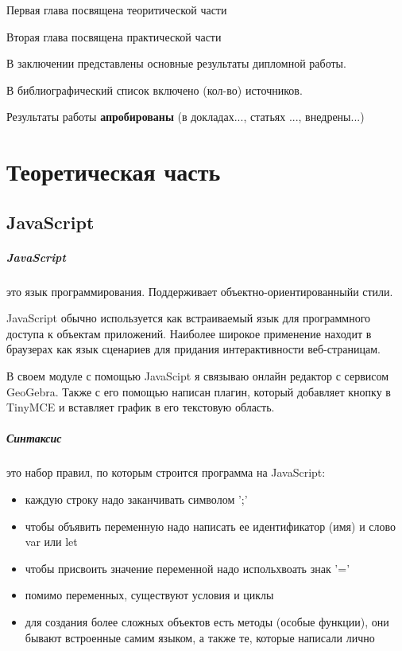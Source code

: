 \documentclass[14pt,Diplom]{diplomwork}
\begin{document}
Первая глава посвящена теоритической части

Вторая глава посвящена практической части


В заключении представлены основные результаты дипломной работы.

В библиографический список включено (кол-во) источников.


Результаты работы \textbf{апробированы} (в докладах..., статьях ..., внедрены...)


\chapter{Теоретическая часть}

\section{JavaScript}

\paragraph{JavaScript}

это язык программирования. Поддерживает объектно-ориентированныйи стили.

JavaScript обычно используется как встраиваемый язык для программного доступа к объектам приложений. Наиболее широкое применение находит в браузерах как язык сценариев для придания интерактивности веб-страницам.

В своем модуле с помощью JavaScipt я связываю онлайн редактор с сервисом GeoGebra. Также с его помощью написан плагин, который добавляет кнопку в TinyMCE и вставляет график в его текстовую область. 

\paragraph{Синтаксис}
 это набор правил, по которым строится программа на JavaScript:
 \begin{itemize}
 	\item каждую строку надо заканчивать символом ';'
 	\item чтобы объявить переменную надо написать ее идентификатор (имя) и слово var или let
 	\item чтобы присвоить значение переменной надо испольхвоать знак '='
 	\item помимо переменных, существуют условия и циклы
 	\item для создания более сложных объектов есть методы (особые функции), они бывают встроенные самим языком, а также те, которые написали лично
\end{itemize}
\end{document}
